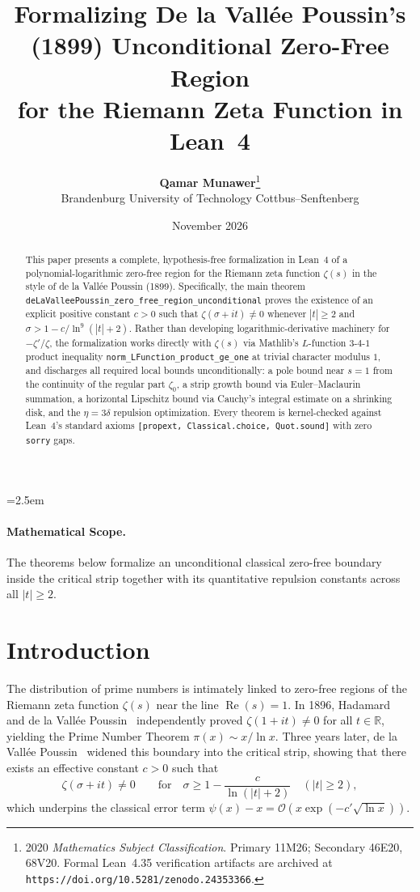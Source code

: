 \documentclass[11pt,a4paper]{article}
\title{\textbf{Formalizing De la Vall{\'e}e Poussin's (1899) Unconditional Zero-Free Region\\for the Riemann Zeta Function in Lean~4}}
\author{\textbf{Qamar Munawer}\thanks{2020 \emph{Mathematics Subject Classification}. Primary 11M26; Secondary 46E20, 68V20. Formal Lean~4.35 verification artifacts are archived at \texttt{https://doi.org/10.5281/zenodo.24353366}.}\\[0.3em]
\small Brandenburg University of Technology Cottbus--Senftenberg}
\date{November 2026}
\theoremstyle{definition}
\newcommand{\Rset}{\mathbb{R}}
\begin{document}
\linespread{1.15}\selectfont
\emergencystretch=2.5em

\maketitle

\begin{abstract}
This paper presents a complete, hypothesis-free formalization in Lean~4 of a polynomial-logarithmic zero-free region for the Riemann zeta function $\zeta(s)$ in the style of de la Vall{\'e}e Poussin (1899). Specifically, the main theorem \texttt{deLaValleePoussin\_\allowbreak zero\_\allowbreak free\_\allowbreak region\_\allowbreak unconditional} proves the existence of an explicit positive constant $c > 0$ such that $\zeta(\sigma + it) \ne 0$ whenever $|t| \ge 2$ and $\sigma > 1 - c / \ln^9(|t|+2)$. Rather than developing logarithmic-derivative machinery for $-\zeta'/\zeta$, the formalization works directly with $\zeta(s)$ via Mathlib's $L$-function $3$-$4$-$1$ product inequality \texttt{norm\_LFunction\_\allowbreak product\_ge\_one} at trivial character modulus $1$, and discharges all required local bounds unconditionally: a pole bound near $s = 1$ from the continuity of the regular part $\zeta_0$, a strip growth bound via Euler--Maclaurin summation, a horizontal Lipschitz bound via Cauchy's integral estimate on a shrinking disk, and the $\eta = 3\delta$ repulsion optimization. Every theorem is kernel-checked against Lean~4's standard axioms \texttt{[propext, Classical.choice, Quot.sound]} with zero \texttt{sorry} gaps.
\end{abstract}

\paragraph{Mathematical Scope.}
The theorems below formalize an unconditional classical zero-free boundary inside the critical strip together with its quantitative repulsion constants across all $|t| \ge 2$.

\section{Introduction}

The distribution of prime numbers is intimately linked to zero-free regions of the Riemann zeta function $\zeta(s)$ near the line $\operatorname{Re}(s) = 1$. In 1896, Hadamard~\cite{hadamard1896} and de la Vall{\'e}e Poussin~\cite{valleepoussin1896} independently proved $\zeta(1 + it) \ne 0$ for all $t \in \Rset$, yielding the Prime Number Theorem $\pi(x) \sim x / \ln x$. Three years later, de la Vall{\'e}e Poussin~\cite{valleepoussin1899} widened this boundary into the critical strip, showing that there exists an effective constant $c > 0$ such that
\begin{equation}\label{eq:classical_zfr}
\zeta(\sigma + it) \ne 0 \qquad \text{for} \quad \sigma \ge 1 - \frac{c}{\ln(|t|+2)} \quad (|t| \ge 2),
\end{equation}
which underpins the classical error term $\psi(x) - x = \mathcal{O}(x \exp(-c'\sqrt{\ln x}))$.
\end{document}
